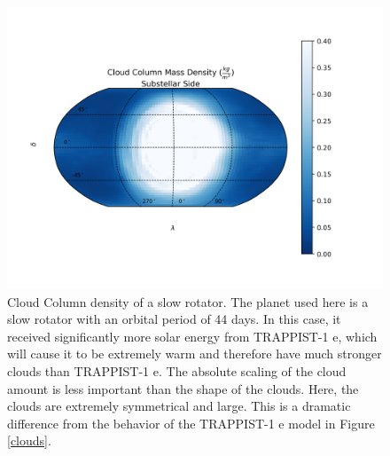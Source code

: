 \begin{figure}[htbp]
    \begin{center}
        \includegraphics[width=\textwidth]{models/slow_rotator_cloud_map.png}
        \caption[Column Density of a Slow Rotator]{Cloud Column density of a
        slow rotator. The planet used here is a slow rotator with an orbital
        period of 44 days. In this case, it received significantly more solar
        energy from TRAPPIST-1 e, which will cause it to be extremely warm and
        therefore have much stronger clouds than TRAPPIST-1 e. The absolute
        scaling of the cloud amount is less important than the shape of the
        clouds. Here, the clouds are extremely symmetrical and large. This is a
        dramatic difference from the behavior of the TRAPPIST-1 e model in
        Figure \ref{clouds}.}
        \label{slowrotator}
    \end{center}
\end{figure}

